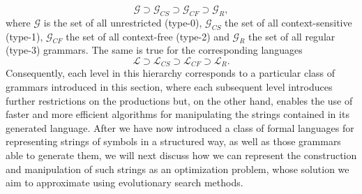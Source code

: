 \begin{equation}
	\mathcal{G} \supset \mathcal{G}_{CS} \supset \mathcal{G}_{CF} \supset \mathcal{G}_{R}, 
\end{equation} 
where $\mathcal{G}$ is the set of all unrestricted (type-0), $\mathcal{G}_{CS}$ the set of all context-sensitive (type-1), $\mathcal{G}_{CF}$ the set of all context-free (type-2) and $\mathcal{G}_{R}$ the set of all regular (type-3) grammars.
The same is true for the corresponding languages
\begin{equation}
	\mathcal{L} \supset \mathcal{L}_{CS} \supset \mathcal{L}_{CF} \supset \mathcal{L}_{R}. 
\end{equation}
Consequently, each level in this hierarchy corresponds to a particular class of grammars introduced in this section, where each subsequent level introduces further restrictions on the productions but, on the other hand, enables the use of faster and more efficient algorithms for manipulating the strings contained in its generated language.
After we have now introduced a class of formal languages for representing strings of symbols in a structured way, as well as those grammars able to generate them, we will next discuss how we can represent the construction and manipulation of such strings as an optimization problem, whose solution we aim to approximate using evolutionary search methods.